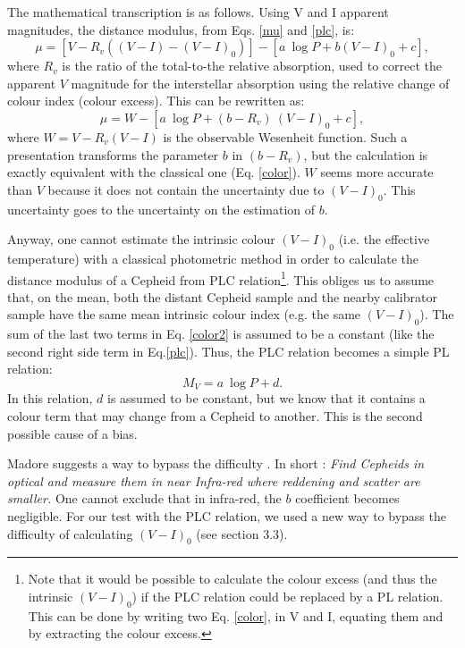 The mathematical transcription is as follows. Using V and I apparent magnitudes, the distance modulus, from Eqs. \ref{mu} and \ref{plc}, is:
\begin{equation}
\mu =[ V - R_v ((V-I) - (V-I)_0)] - [a \ \log P + b  (V-I)_0 + c] ,
\label{color}
\end{equation}
where $R_v$ is the ratio of the total-to-the relative absorption, used to correct the apparent $V$ magnitude for the interstellar absorption using the relative change of colour index (colour excess). This can be rewritten as:
\begin{equation}
\mu =W- [a \ \log P + (b-R_v) \ (V-I)_0 + c] ,
\label{color2}
\end{equation}
where $W= V - R_v (V-I)$ is the observable Wesenheit function\cite{bergh}.
Such a presentation transforms the parameter $b$ in $(b-R_v)$\cite{madore2}, but the calculation is exactly equivalent with the classical one (Eq. \ref{color}). $W$ seems more accurate than $V$ because it does not contain the uncertainty due to $(V-I)_0$. This uncertainty goes to the uncertainty on the estimation of $b$.

Anyway, one cannot estimate  the intrinsic colour $(V-I)_0$ (i.e. the effective temperature) with a classical photometric method in order to calculate the distance modulus of a Cepheid from PLC relation\footnote{Note that it would be possible to calculate the colour excess (and thus the intrinsic $(V-I)_0$) if the PLC relation could be replaced by a PL relation. This can be done by writing  two Eq. \ref{color}, in V and I, equating them  and by extracting the colour excess.}. 
This obliges us to assume that, on the mean, both the distant Cepheid sample and the nearby calibrator sample have the same mean intrinsic colour index (e.g. the same $ (V-I)_0 $). The sum of the last two terms in Eq. \ref{color2} is assumed to be a constant (like the second right side term in Eq.\ref{plc}). Thus, the PLC relation  becomes a simple PL relation: 
\begin{equation}
M_V = a \ \log P +  d .
\label{pl}
\end{equation}
In this relation, $d$  is assumed to be constant, but we know that it contains a colour term that may change from a Cepheid to another. This is the second possible cause of a bias.


Madore suggests  a way to bypass the difficulty \cite{madore1}. In short : {\it{Find Cepheids in optical and measure them  in near Infra-red where reddening and scatter are smaller.}}  One cannot exclude that in infra-red, the $b$ coefficient becomes negligible. 
For our test with the PLC relation, we used a new way to bypass the difficulty of calculating $(V-I)_0$  (see section 3.3).


